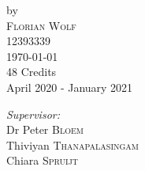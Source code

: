 \documentclass{article}
\begin{document}
\begin{titlepage}
by\\[0.2cm]

\textsc{\Large Florian Wolf}\\[0.2cm] %

{12393339}\\[1cm]










{\Large \today}\\[1cm] %



{48 Credits}\\ %
{April 2020 - January 2021}\\[1cm]






\begin{minipage}[t]{0.4\textwidth}

\begin{flushleft} \large

\emph{Supervisor:} \\

Dr Peter \textsc{Bloem} \\ Thiviyan \textsc{Thanapalasingam} \\ Chiara \textsc{Spruijt} %

\end{flushleft}

\end{minipage}

~

\begin{minipage}[t]{0.4\textwidth}

\begin{flushright} \large


\end{flushright}
\end{minipage}
\end{titlepage}
\end{document}
